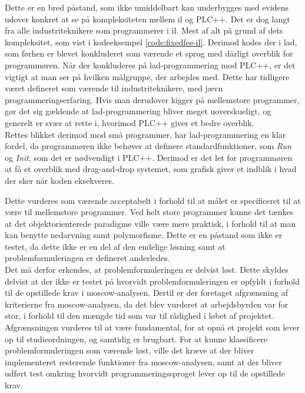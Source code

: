 Dette er en bred påstand, som ikke umiddelbart kan underbygges med evidens udover konkret at se på kompleksiteten mellem \gls{il} og PLC++.
Det er dog langt fra alle industriteknikere som programmerer i \gls{il}. Mest af alt på grund af dets kompleksitet, som vist i kodeeksempel \ref{code:fixedfee-il}.
Derimod kodes der i \gls{lad}, som førhen er blevet konkluderet som værende et sprog med dårligt overblik for programmøren.
Når der konkluderes på \gls{lad}-programmering mod PLC++, er det vigtigt at man ser på hvilken målgruppe, der arbejdes med.
Dette har tidligere været defineret som værende til industriteknikere, med jævn programmeringserfaring.
Hvis man derudover kigger på mellemstore programmer, gør det sig gældende at \gls{lad}-programmering bliver meget uoverskueligt, og generelt er svær at rette i, hvorimod PLC++ giver et bedre overblik.\\

\noindent Rettes blikket derimod mod små programmer, har \gls{lad}-programmering en klar fordel, da programmøren ikke behøver at definere standardfunktioner, som \textit{Run} og \textit{Init}, som det er nødvendigt i PLC++. Derimod er det let for programmøren at få et overblik med drag-and-drop systemet, som grafisk giver et indblik i hvad der sker når koden eksekveres.

Dette vurderes som værende acceptabelt i forhold til at målet er specificeret til at være til mellemstore programmer.
Ved helt store programmer kunne det tænkes at det objektorienterede paradigme ville være mere praktisk, i forhold til at man kan benytte nedarvning samt polymorfisme. Dette er en påstand som ikke er testet, da dette ikke er en del af den endelige løsning samt at problemformuleringen er defineret anderledes.\\

\noindent Det må derfor erkendes, at problemformuleringen er delvist løst.
Dette skyldes delvist at der ikke er testet på hvorvidt problemformuleringen er opfyldt i forhold til de opstillede krav i \gls{moscow}-analysen.
Dertil er der foretaget afgrænsning af kriterierne fra \gls{moscow}-analysen, da det blev vurderet at arbejdsbyrden var for stor, i forhold til den mængde tid som var til rådighed i løbet af projektet.
Afgrænsningen vurderes til at være fundamental, for at opnå et projekt som lever op til studieordningen, og samtidig er brugbart.
For at kunne klassificere problemformuleringen som værende løst, ville det kræve at der bliver implementeret resterende funktioner fra \gls{moscow}-analysen, samt at der bliver udført test omkring hvorvidt programmeringssproget lever op til de opstillede krav.